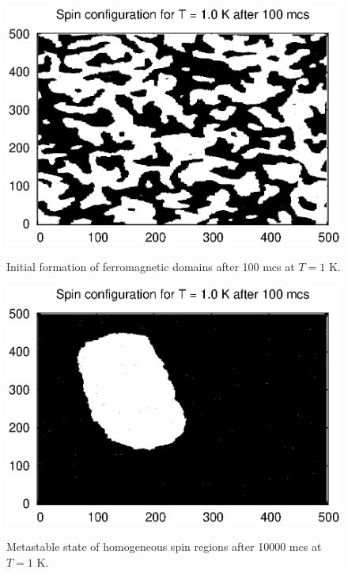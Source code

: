 \documentclass[a4paper]{article}
\begin{document}
\begin{figure}[h]
\centering
\begin{minipage}[b]{0.45\linewidth}
\includegraphics[width=1\textwidth]{cold_long.eps}
\label{fig:minipage1}
\caption{Initial formation of ferromagnetic domains after 100 mcs at $T = 1$ K.}
\end{minipage}
\quad
\begin{minipage}[b]{0.45\linewidth}
\includegraphics[width=1\textwidth]{cold.eps}
\label{fig:minipage2}
\caption{Metastable state of homogeneous spin regions after 10000 mcs at $T = 1$ K. }
\end{minipage}
\end{figure}

\vspace{3mm}
\end{document}
